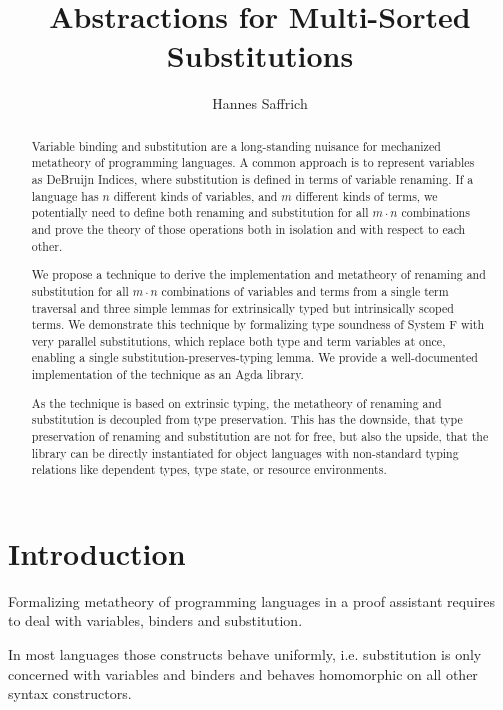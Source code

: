 \documentclass[sigplan,10pt]{acmart}
\title{Abstractions for Multi-Sorted Substitutions}
\author{Hannes Saffrich}
\affiliation{
  \institution{University of Freiburg}      %
  \country{Germany}                         %
}
\begin{document}
  \begin{abstract}
    Variable binding and substitution are a long-standing nuisance for mechanized
    metatheory of programming languages. A common approach is to represent
    variables as DeBruijn Indices, where substitution is defined in terms of
    variable renaming. If a language has $n$ different kinds of variables, and
    $m$ different kinds of terms, we potentially need to define both
    renaming and substitution for all $m\cdot n$ combinations and prove the
    theory of those operations both in isolation and with respect to each other.


    We propose a technique to derive the implementation and metatheory of
    renaming and substitution for all $m\cdot n$ combinations of variables and terms
    from a single term traversal and three simple lemmas for extrinsically typed
    but intrinsically scoped terms.
    We demonstrate this technique by formalizing type soundness of System F with
    very parallel substitutions, which replace both type and term variables at
    once, enabling a single substitution-preserves-typing lemma.
    We provide a well-documented implementation of the technique as an Agda
    library.

    As the technique is based on extrinsic typing, the metatheory of renaming
    and substitution is decoupled from type preservation.
    This has the downside, that type preservation of renaming and substitution
    are not for free, but also the upside, that the library can be directly
    instantiated for object languages with non-standard typing relations like
    dependent types, type state, or resource environments.
  \end{abstract}

  \maketitle

  \section{Introduction}
  Formalizing metatheory of programming languages in a proof assistant 
  requires to deal with variables, binders and substitution.

  In most languages those constructs behave uniformly,
  i.e. substitution is only concerned with variables and binders and
  behaves homomorphic on all other syntax constructors.
\end{document}
